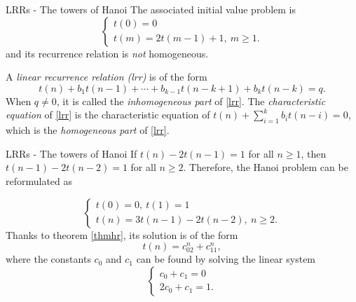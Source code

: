 \documentclass{beamer}
\begin{document}
\begin{frame}{LRRs - The towers of Hanoi}
	The associated initial value problem is
	\begin{displaymath}
		\begin{cases}
			t(0)= 0\\
			t(m)= 2t(m-1) + 1,\ m \geq 1.
		\end{cases}
	\end{displaymath}
	and its recurrence relation is \emph{not} homogeneous.
	\begin{defn}
		A \emph{linear recurrence relation (lrr)} is of the form
		\begin{equation}\label{lrr}
			t(n) + b_1t(n-1) + \cdots + b_{k-1}t(n-k+1) + b_kt(n-k)= q.
		\end{equation}
		When $q \neq 0$, it is called the \emph{inhomogeneous part} of \eqref{lrr}.
		The \emph{characteristic equation} of \eqref{lrr} is the characteristic
		equation of $t(n) + \sum_{i= 1}^k b_it(n-i)= 0$, which is the
		\emph{homogeneous part} of \eqref{lrr}.
	\end{defn}
\end{frame}

%

\begin{frame}{LRRs - The towers of Hanoi}
	If $t(n) - 2t(n-1) = 1$ for all $n \geq 1$, then $t(n-1) - 2t(n-2) = 1$ for
	all $n \geq 2$. Therefore, the Hanoi problem can be reformulated as

	\begin{displaymath}
		\begin{cases}
			t(0)= 0,\ t(1)= 1\\
			t(n)= 3t(n-1) - 2t(n-2),\ n \geq 2.
		\end{cases}
	\end{displaymath}
	Thanks to theorem \ref{thmhr}, its solution is of the form
	\begin{equation*}
		t(n) = c_02^n + c_11^n,
	\end{equation*}
	where the constants $c_0$ and $c_1$ can be found by solving the linear
	system
	\begin{displaymath}
		\begin{cases}
			c_0 + c_1 = 0\\
			2c_0 + c_1 = 1.
		\end{cases}
	\end{displaymath}
\end{frame}

%
\end{document}
